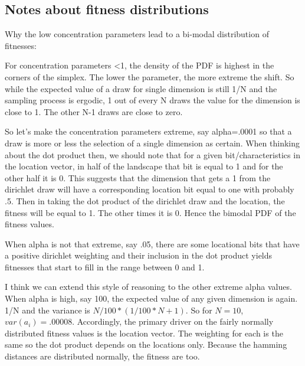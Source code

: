 \documentclass[12pt]{article}
\begin{document}
\subsection*{Notes about fitness distributions}
Why the low concentration parameters lead to a bi-modal distribution of fitnesses:

For concentration parameters <1, the density of the PDF is highest in the corners of the simplex. The lower the parameter, the more extreme the shift. So while the expected value of a draw for single dimension is still 1/N and the sampling process is ergodic, 1 out of every N draws the value for the dimension is close to 1. The other N-1 draws are close to zero.

So let's make the concentration parameters extreme, say alpha=.0001 so that a draw is more or less the selection of a single dimension as certain. When thinking about the dot product then, we should note that for a given bit/characteristics in the location vector, in half of the landscape that bit is equal to 1 and for the other half it is 0. This suggests that the dimension that gets a 1 from the dirichlet draw will have a corresponding location bit equal to one with probably .5. Then in taking the dot product of the dirichlet draw and the location, the fitness will be equal to 1. The other times it is 0. Hence the bimodal PDF of the fitness values.

When alpha is not that extreme, say .05, there are some locational bits that have a positive dirichlet weighting and their inclusion in the dot product yields fitnesses that start to fill in the range between 0 and 1.

I think we can extend this style of reasoning to the other extreme alpha values. When alpha is high, say 100, the expected value of any given dimension is again. 1/N and the variance is $N/100*(1/100*N+1)$. So for $N=10$, $var(a_i) = .00008$. Accordingly, the primary driver on the fairly normally distributed fitness values is the location vector. The weighting for each is the same so the dot product depends on the locations only. Because the hamming distances are distributed normally, the fitness are too.
\end{document}
